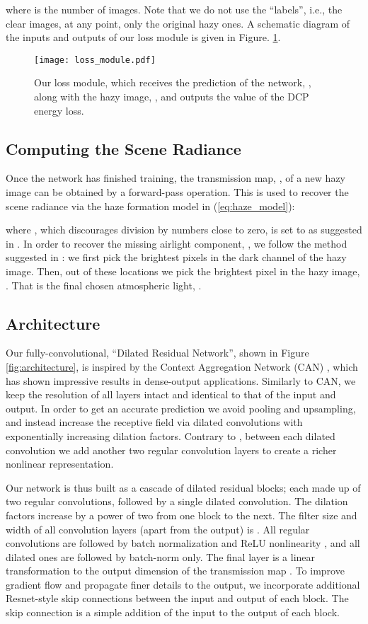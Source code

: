 \documentclass[10pt,twocolumn,twoside]{IEEEtran}
\begin{document}
where  is the number of images. Note that we do not use the ``labels'', i.e., the clear images, at any point, only the original hazy ones. A schematic diagram of the inputs and outputs of our loss module is given in Figure. \ref{fig:dehazing_loss}.

\begin{figure}[t!]
\centering
\texttt{[image: loss\_module.pdf]}
\caption{Our loss module, which receives the prediction of the network, , along with the hazy image, , and outputs the value of the DCP \cite{DCP} energy loss.}
\label{fig:dehazing_loss}
\end{figure}

\subsection{Computing the Scene Radiance}
Once the network has finished training, the transmission map, , of a new hazy image can be obtained by a forward-pass operation. This is used to recover the scene radiance via the haze formation model in (\ref{eq:haze_model}):

where , which discourages division by numbers close to zero, is set to  as suggested in  \cite{DCP}. In order to recover the missing airlight component, , we follow the method suggested in \cite{DCP}: we first pick the  brightest pixels in the dark channel of the hazy image. Then, out of these locations we pick the brightest pixel in the hazy image, . That is the final chosen atmospheric light, .

\subsection{Architecture}
Our fully-convolutional, ``Dilated Residual Network'', shown in Figure \ref{fig:architecture}, is inspired by the Context Aggregation Network (CAN) \cite{CAN}, which has shown impressive results in dense-output applications. Similarly to CAN, we keep the resolution of all layers intact and identical to that of the input and output. In order to get an accurate prediction we avoid pooling and upsampling, and instead increase the receptive field via dilated convolutions with exponentially increasing dilation factors. Contrary to \cite{CAN}, between each dilated convolution we add another two regular convolution layers to create a richer nonlinear representation.

Our network is thus built as a cascade of  dilated residual blocks; each made up of two regular convolutions, followed by a single dilated convolution. The dilation factors increase by a power of two from one block to the next. The filter size and width of all convolution layers (apart from the output) is . All regular convolutions are followed by batch normalization \cite{batch_norm} and ReLU nonlinearity \cite{alexnet}, and all dilated ones are followed by batch-norm only. The final layer is a linear transformation to the output dimension of the transmission map .
To improve gradient flow and propagate finer details to the output, we incorporate additional Resnet-style \cite{resnet} skip connections between the input and output of each block. The skip connection is a simple addition of the input to the output of each block.
\end{document}
